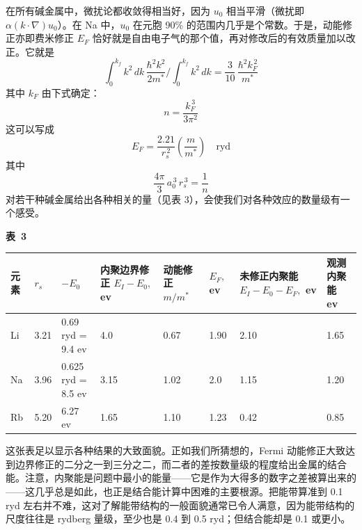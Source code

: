 在所有碱金属中，微扰论都收敛得相当好，因为 $u_0$ 相当平滑（微扰即 $\alpha(k\cdot\nabla)u_0$）。在 Na 中，$u_0$ 在元胞 90\% 的范围内几乎是个常数。于是，动能修正亦即费米修正 $E_F$ 恰好就是自由电子气的那个值，再对修改后的有效质量加以改正。它就是
\begin{equation*}
\int_0^{k_f} k^2\,dk\,\frac{\hbar^2 k^2}{2m^*}\Bigg/\int_0^{k_f} k^2\,dk=\frac{3}{10}\,\frac{\hbar^2 k_F^{\,2}}{m^*}
\end{equation*}
其中 $k_F$ 由下式确定：
\begin{equation*}
n=\frac{k_F^{\,3}}{3\pi^2}
\end{equation*}
这可以写成
\begin{equation*}
E_F=\frac{2.21}{r_s^{\,2}}\left(\frac{m}{m^*}\right)\quad\mathrm{ryd}
\end{equation*}
其中
\begin{equation*}
\frac{4\pi}{3}\,a_0^{\,3}\,r_s^{\,3}=\frac{1}{n}
\end{equation*}
对若干种碱金属给出各种相关的量（见表 3），会使我们对各种效应的数量级有一个感受。


\begin{table}[H]
\centering
{\bfseries 表~3}\\[6pt]
\small
\setlength{\tabcolsep}{4.5pt}
\renewcommand{\arraystretch}{1.25}
\begin{tabular}{@{}llllllll@{}}
\toprule
元素 & $r_s$ & $-E_0$ & \shortstack{内聚边界修正\\$E_I-E_0$\ensuremath{,} ev}
 & \shortstack{动能修正\\$m/m^*$} & $E_F$\ensuremath{,} ev
 & \shortstack{未修正内聚能\\$E_I-E_0-E_F$\ensuremath{,} ev}
 & \shortstack{观测内聚能\\ev}\\
\midrule
Li & 3.21 & \shortstack[r]{0.69 ryd =\\9.4 ev} & 4.0 & 0.67 & 1.90 & 2.10 & 1.65\\
Na & 3.96 & \shortstack[r]{0.625 ryd =\\8.5 ev} & 3.15 & 1.02 & 2.0 & 1.15 & 1.20\\
Rb & 5.20 & 6.27 ev & 1.65 & 1.10 & 1.23 & 0.42 & 0.85\\
\bottomrule
\end{tabular}
\end{table}

这张表足以显示各种结果的大致面貌。正如我们所猜想的，Fermi 动能修正大致达到边界修正的二分之一到三分之二，而二者的差按数量级的程度给出金属的结合能。注意，内聚能是问题中最小的能量——它是作为大得多的数字之差被算出来的——这几乎总是如此，也正是结合能计算中困难的主要根源。把能带算准到 0.1 ryd 左右并不难，这对了解能带结构的一般面貌通常已令人满意，因为能带结构的尺度往往是 rydberg 量级，至少也是 0.4 到 0.5 ryd；但结合能却是 0.1 或更小。
